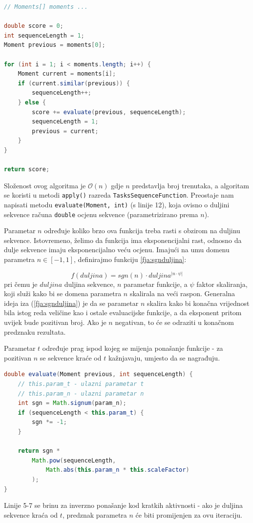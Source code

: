 \documentclass[times, utf8, zavrsni]{fer}
\begin{document}
\begin{lstlisting}[language=java, caption=Algoritam određivanja duljine sekvence aktivnosti, label={code:duljina sekvence}]
// Moments[] moments ...

double score = 0;
int sequenceLength = 1;
Moment previous = moments[0];

for (int i = 1; i < moments.length; i++) {
	Moment current = moments[i];
	if (current.similar(previous)) {
		sequenceLength++;
	} else {
		score += evaluate(previous, sequenceLength);
		sequenceLength = 1;
		previous = current;
	}
}

return score;
\end{lstlisting}
Složenost ovog algoritma je $\mathcal{O}(n)$ gdje $n$ predstavlja broj trenutaka, a algoritam se koristi u metodi \texttt{apply()} razreda \texttt{TasksSequenceFunction}. Preostaje nam napisati metodu \texttt{evaluate(Moment, int)} (s linije 12), koja ovisno o duljini sekvence računa \texttt{double} ocjenu sekvence (parametrizirano prema $n$).

Parametar $n$ određuje koliko brzo ova funkcija treba rasti s obzirom na duljinu sekvence.  Istovremeno, želimo da funkcija ima eksponencijalni rast, odnosno da dulje sekvence imaju eksponencijalno veću ocjenu. Imajući na umu domenu parametra $n \in \left[-1, 1\right]$, definirajmo funkciju \ref{fja:sgnduljina}:

\begin{equation}\label{fja:sgnduljina}
f(duljina) = sgn(n) \cdot duljina^{|{n}\cdot{\psi}|}
\end{equation}
pri čemu je $duljina$ duljina sekvence, $n$ parametar funkcije, a $\psi$ faktor skaliranja, koji služi kako bi se domena parametra $n$ skalirala na veći raspon. Generalna ideja iza (\ref{fja:sgnduljina}) je da se parametar $n$ skalira kako bi konačna vrijednost bila istog reda veličine kao i ostale evaluacijske funkcije, a da eksponent pritom uvijek bude pozitivan broj. Ako je $n$ negativan, to će se odraziti u konačnom predznaku rezultata.

Parametar $t$ određuje prag ispod kojeg se mijenja ponašanje funkcije - za pozitivan $n$ se sekvence kraće od $t$ kažnjavaju, umjesto da se nagrađuju.

\begin{lstlisting}[language=java, caption=Ocjena duljine sekvence]
double evaluate(Moment previous, int sequenceLength) {
	// this.param_t - ulazni parametar t
	// this.param_n - ulazni parametar n
	int sgn = Math.signum(param_n);
	if (sequenceLength < this.param_t) {
		sgn *= -1;
	}

	return sgn *
		Math.pow(sequenceLength,
			Math.abs(this.param_n * this.scaleFactor)
		);
}
\end{lstlisting}
Linije 5-7 se brinu za inverzno ponašanje kod kratkih aktivnosti - ako je duljina sekvence kraća od $t$, predznak parametra $n$ će biti promijenjen za ovu iteraciju.
\end{document}
